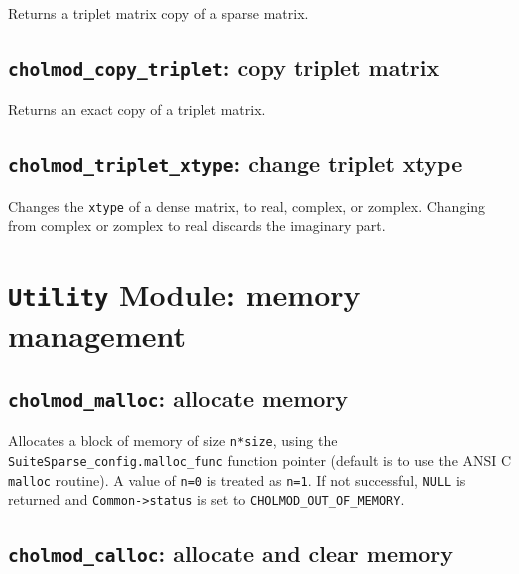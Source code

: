 \documentclass[11pt]{article}
\begin{document}

Returns a triplet matrix copy of a sparse matrix.

\subsection{{\tt cholmod\_copy\_triplet}: copy triplet matrix}


Returns an exact copy of a triplet matrix.

\subsection{{\tt cholmod\_triplet\_xtype}: change triplet xtype}


Changes the {\tt xtype} of a dense matrix, to real, complex, or zomplex.
Changing from complex or zomplex to real discards the imaginary part.

\newpage \section{{\tt Utility} Module: memory management}

\subsection{{\tt cholmod\_malloc}: allocate memory}


Allocates a block of memory of size {\tt n*size}, using the {\tt
SuiteSparse\_config.malloc\_func} function pointer (default is to use the ANSI
C {\tt malloc} routine).  A value of {\tt n=0} is treated as {\tt n=1}.
If not successful, {\tt NULL} is returned and {\tt Common->status} is set to
{\tt CHOLMOD\_OUT\_OF\_MEMORY}.

\subsection{{\tt cholmod\_calloc}: allocate and clear memory}
\end{document}
